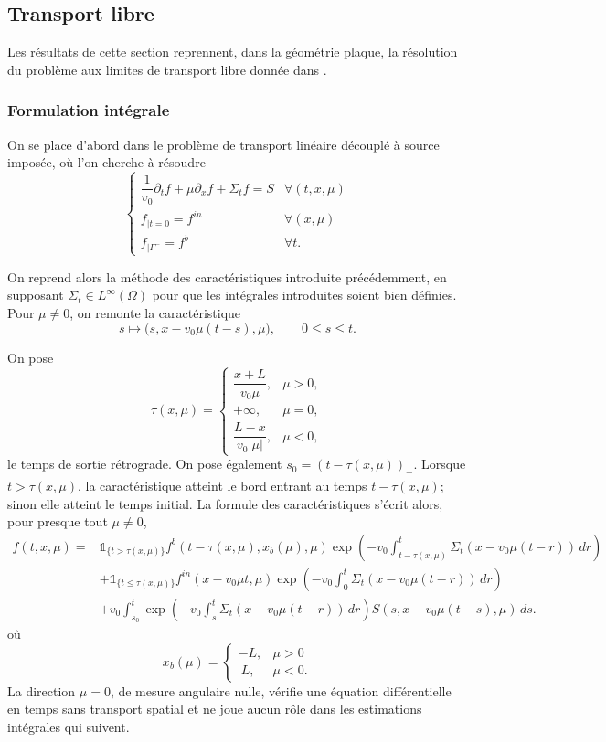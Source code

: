 \documentclass{article}
\begin{document}
\subsection{Transport libre}
\label{subsec:Transport libre}

Les résultats de cette section reprennent, dans la géométrie plaque, la résolution du problème aux limites de transport libre donnée dans \cite[chap.~2]{Allaire2018}.

\subsubsection{Formulation intégrale}

On se place d'abord dans le problème de transport linéaire découplé à source imposée, où l'on cherche à résoudre
\[
\begin{cases}
    \dfrac1{v_0}\partial_t f + \mu\partial_x f + \Sigma_t f =S &\forall(t,x,\mu) \\
    f_{|t=0} = f^{in} & \forall(x,\mu) \\
    f_{|\Gamma^-} =f^b & \forall t.
\end{cases}
\]

On reprend alors la méthode des caractéristiques introduite précédemment, en supposant
\(\Sigma_t\in L^\infty(\Omega)\)
pour que les intégrales introduites soient bien définies. Pour $\mu\neq0$, on remonte la caractéristique
\[
s\longmapsto \bigl(s,x-v_0\mu(t-s),\mu\bigr),
\qquad 0\leq s\leq t.
\]

On pose
\[
\tau(x,\mu) =
\begin{cases}
    \dfrac{x+L}{v_0\mu}, & \mu>0, \\[1.2ex]
    +\infty,
    & \mu=0, \\[1.2ex]
    \dfrac{L-x}{v_0|\mu|},
    & \mu<0,
\end{cases}
\]
le temps de sortie rétrograde. On pose également $s_0=(t-\tau(x,\mu))_+$. Lorsque $t>\tau(x,\mu)$, la caractéristique atteint le bord entrant au temps $t-\tau(x,\mu)$; sinon elle atteint le temps initial. La formule des caractéristiques s'écrit alors, pour presque tout $\mu\neq0$,
\begin{align}
    f(t,x,\mu)
    ={}&\mathbb{1}_{\{t>\tau(x,\mu)\}}
    f^b(t-\tau(x,\mu),x_b(\mu),\mu)
    \exp\!\left(-v_0\int_{t-\tau(x,\mu)}^t
    \Sigma_t(x-v_0\mu(t-r))\,dr\right) \\
    &+\mathbb{1}_{\{t\leq\tau(x,\mu)\}}
    f^{in}(x-v_0\mu t,\mu)
    \exp\!\left(-v_0\int_0^t
    \Sigma_t(x-v_0\mu(t-r))\,dr\right) \\
    &+v_0\int_{s_0}^{t}
    \exp\!\left(-v_0\int_s^t
    \Sigma_t(x-v_0\mu(t-r))\,dr\right)
    S(s,x-v_0\mu(t-s),\mu)\,ds.
    \label{eq:formule-transport-libre}
\end{align}
où
\[
x_b(\mu) = 
\begin{cases}
    -L, & \mu>0 \\\
    L,&\mu<0.
\end{cases}
\]
La direction $\mu=0$, de mesure angulaire nulle, vérifie une équation différentielle en temps sans transport spatial et ne joue aucun rôle dans les estimations intégrales qui suivent.
\end{document}
